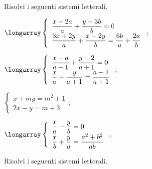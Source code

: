 \begin{esercizio}[\Ast] %
 \label{ese:19.80}
 Risolvi i seguenti sistemi letterali.
\begin{multicols}{2}
\begin{enumeratea}
\item $\longarray\left\{\begin{array}{l}\dfrac{x-2a}{a}+\dfrac{y-3b}{b}=0\\\dfrac{3x+2y}{a}+\dfrac{x-2y}{b}=
\dfrac{6b}{a}+\dfrac{2a}{b}\end{array}\right.;$
\item $\longarray\left\{\begin{array}{l}\dfrac{x-a}{a-1}+\dfrac{y-2}{a+1}=0\\\dfrac{x}{a}-\dfrac{y}{a+1}=
\dfrac{a-1}{a+1}\end{array}\right.;$
\item $\left\{\begin{array}{l}x+my=m^{2}+1\\2x-y=m+3 \end{array}\right.;$
\item $\longarray\left\{\begin{array}{l}\dfrac{x}{a}-\dfrac{y}{b}=0\\\dfrac{x}{b}+\dfrac{y}{a}=\dfrac{a^{2}+b^{2}}{ab} \end{array}\right..$
\end{enumeratea}
\end{multicols}
\end{esercizio}

\begin{esercizio}[\Ast] %
 \label{ese:19.81}
 Risolvi i seguenti sistemi letterali.
\begin{multicols}{2}
\begin{enumeratea}
\end{enumeratea}
\end{multicols}
\end{esercizio}

